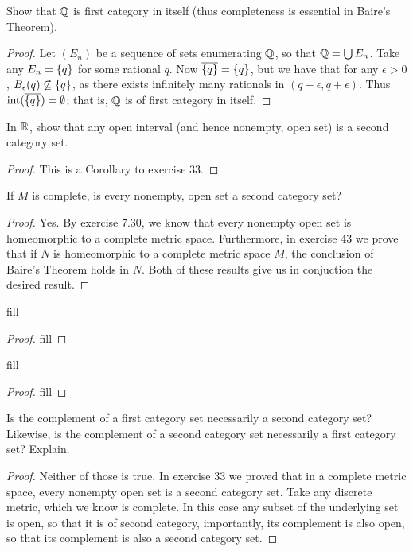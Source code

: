 \begin{exercise}{31}
Show that $\mathbb{Q}$ is first category in itself (thus completeness is essential in Baire's Theorem).
\end{exercise}
\begin{proof}
Let $(E_n)$ be a sequence of sets enumerating $\mathbb{Q}$, so that $\mathbb{Q} = \bigcup E_n$.
Take any $E_n = \{q\}$ for some rational $q$.
Now $\overline{\{q\}} = \{q\}$, but we have that for any $\epsilon > 0$, $B_\epsilon(q) \not\subseteq \{q\}$, as there exists infinitely many rationals in $(q-\epsilon, q+\epsilon)$.
Thus $\operatorname{int}(\overline{\{q\}}) = \emptyset$;
that is, $\mathbb{Q}$ is of first category in itself.
\end{proof} 

\begin{exercise}{32}
In $\mathbb{R}$, show that any open interval (and hence nonempty, open set) is a second category set.
\end{exercise}
\begin{proof}
This is a Corollary to exercise 33.
\end{proof} 

\begin{exercise}{33}
If $M$ is complete, is every nonempty, open set a second category set?
\end{exercise}
\begin{proof}
Yes.
By exercise 7.30, we know that every nonempty open set is homeomorphic to a complete metric space.
Furthermore, in exercise 43 we prove that if $N$ is homeomorphic to a complete metric space $M$, the conclusion of Baire's Theorem holds in $N$.
Both of these results give us in conjuction the desired result.
\end{proof} 

\begin{exercise}{36}
fill
\end{exercise}
\begin{proof}
fill
\end{proof} 

\begin{exercise}{37}
fill
\end{exercise}
\begin{proof}
fill
\end{proof} 

\begin{exercise}{38}
Is the complement of a first category set necessarily a second category set?
Likewise, is the complement of a second category set necessarily a first category set?
Explain.
\end{exercise}
\begin{proof}
Neither of those is true. 
In exercise 33 we proved that in a complete metric space, every nonempty open set is a second category set.
Take any discrete metric, which we know is complete.
In this case any subset of the underlying set is open, so that it is of second category, importantly, its complement is also open, so that its complement is also a second category set.
\end{proof} 


